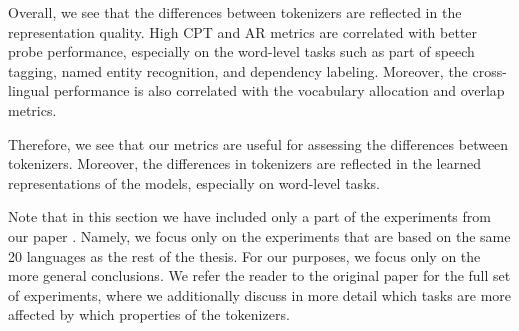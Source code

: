 Overall, we see that the differences between tokenizers are reflected in the representation quality. High CPT and AR metrics are correlated with better probe performance, especially on the word-level tasks such as part of speech tagging, named entity recognition, and dependency labeling. Moreover, the cross-lingual performance is also correlated with the vocabulary allocation and overlap metrics. 

Therefore, we see that our metrics are useful for assessing the differences between tokenizers. Moreover, the differences in tokenizers are reflected in the learned representations of the models, especially on word-level tasks.

Note that in this section we have included only a part of the experiments from our paper \citet{limisiewicz_tokenization_2023}. Namely, we focus only on the experiments that are based on the same 20 languages as the rest of the thesis. For our purposes, we focus only on the more general conclusions. We refer the reader to the original paper for the full set of experiments, where we additionally discuss in more detail which tasks are more affected by which properties of the tokenizers.







